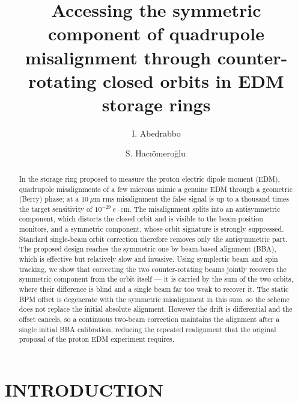 \documentclass[aps,prab,reprint,superscriptaddress,nofootinbib]{revtex4-2}
\begin{document}
	\title{Accessing the symmetric component of quadrupole misalignment through
		counter-rotating closed orbits in EDM storage rings}

	\author{I. Abedrabbo}
	\author{S. Hac{\i}\"omero\u{g}lu\,}


	\begin{abstract}
		In the storage ring proposed to measure the proton electric dipole moment (EDM), quadrupole misalignments of a few microns mimic a genuine EDM through a geometric (Berry) phase; at a $10~\mu$m rms misalignment the false signal is up to a thousand times the target sensitivity of $10^{-29}~e\cdot$cm. The misalignment splits into an antisymmetric component, which distorts the closed orbit and is visible to the beam-position monitors, and a symmetric component, whose orbit signature is strongly suppressed. Standard single-beam orbit correction therefore removes only the antisymmetric part. The proposed design reaches the symmetric one by beam-based alignment (BBA), which is effective but relatively slow and invasive. Using symplectic beam and spin tracking, we show that correcting the two counter-rotating beams jointly recovers the symmetric component from the orbit itself — it is carried by the sum of the two orbits, where their difference is blind and a single beam far too weak to recover it. The static BPM offset is degenerate with the symmetric misalignment in this sum, so the scheme does not replace the initial absolute alignment. However the drift is differential and the offset cancels, so a continuous two-beam correction maintains the alignment after a single initial BBA calibration, reducing the repeated realignment that the original proposal of the proton EDM experiment requires.
	\end{abstract}
	\maketitle

	\section{INTRODUCTION}
	\label{sec:intro}
\end{document}
